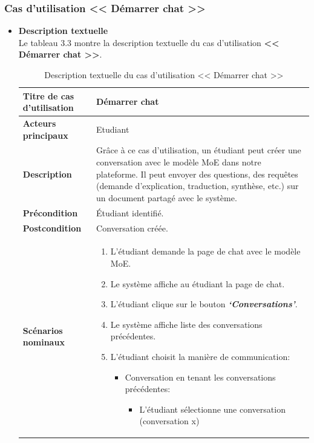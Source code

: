 \subsubsection{ Cas d’utilisation << Démarrer chat >>}
\begin{itemize}[itemsep=1pt, parsep=1pt]
    \item \textbf{Description textuelle}\\
    Le tableau 3.3 montre la description textuelle du cas d’utilisation \textbf{<< Démarrer chat >>}.
    \begin{longtable}{|>{\RaggedRight\arraybackslash}p{4cm}|>{\RaggedRight\arraybackslash}p{12cm}|}
        \caption{Description textuelle du cas d’utilisation << Démarrer chat >>} \\
        \hline
        \textbf{Titre de cas d’utilisation} & \textbf{Démarrer chat} \\
        \hline
        \textbf{Acteurs principaux} & Etudiant \\
        \hline
        \textbf{Description} & Grâce à ce cas d’utilisation, un étudiant peut créer une conversation avec le modèle MoE dans notre plateforme. Il peut envoyer des questions, des requêtes (demande d’explication, traduction, synthèse, etc.) sur un document partagé avec le système. \\
        \hline
        \textbf{Précondition} & Étudiant identifié. \\
        \hline
        \textbf{Postcondition} & Conversation créée. \\
        \hline
        \textbf{Scénarios nominaux} &    
        \begin{enumerate}
            \item L’étudiant demande la page de chat avec le modèle MoE.
            \item Le système affiche au étudiant la page de chat.
            \item L’étudiant clique sur le bouton \textbf{\textit{‘Conversations’}}.
            \item Le système affiche liste des conversations précédentes. 
            \item L’étudiant choisit la manière de communication:
            \begin{itemize}[label=--]
                \item Conversation en tenant les conversations précédentes:
                \begin{itemize}[label=5.1.]
                    \item L’étudiant sélectionne une conversation (conversation x)

\end{itemize}
\end{itemize}
\end{enumerate}
\end{longtable}
\end{itemize}
